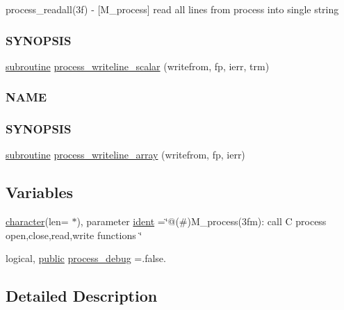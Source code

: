 \begin{DoxyCompactItemize}
\begin{DoxyCompactList}
process\+\_\+readall(3f) -\/ \mbox{[}M\+\_\+process\mbox{]} read all lines from process into single string \subsubsection*{S\+Y\+N\+O\+P\+S\+IS}\end{DoxyCompactList}\item 
\hyperlink{M__stopwatch_83_8txt_acfbcff50169d691ff02d4a123ed70482}{subroutine} \hyperlink{namespacem__process_a72527c0ec0af26dcb14b8bfad6dcd482}{process\+\_\+writeline\+\_\+scalar} (writefrom, fp, ierr, trm)
\begin{DoxyCompactList}\small\item\em \subsubsection*{N\+A\+ME}

\subsubsection*{S\+Y\+N\+O\+P\+S\+IS}\end{DoxyCompactList}\item 
\hyperlink{M__stopwatch_83_8txt_acfbcff50169d691ff02d4a123ed70482}{subroutine} \hyperlink{namespacem__process_a08887a918eba167ceacddf58ca084270}{process\+\_\+writeline\+\_\+array} (writefrom, fp, ierr)
\end{DoxyCompactItemize}
\subsection*{Variables}
\begin{DoxyCompactItemize}
\item 
\hyperlink{option__stopwatch_83_8txt_abd4b21fbbd175834027b5224bfe97e66}{character}(len= $\ast$), parameter \hyperlink{namespacem__process_ac360b3ab77dd978287edf0a0773922de}{ident} =\char`\"{}@(\#)M\+\_\+process(3fm)\+: call C process open,close,read,write functions \char`\"{}
\item 
logical, \hyperlink{M__stopwatch_83_8txt_a2f74811300c361e53b430611a7d1769f}{public} \hyperlink{namespacem__process_a0fabee8d01338d5523fbdea5c5f1e894}{process\+\_\+debug} =.false.
\end{DoxyCompactItemize}


\subsection{Detailed Description}
